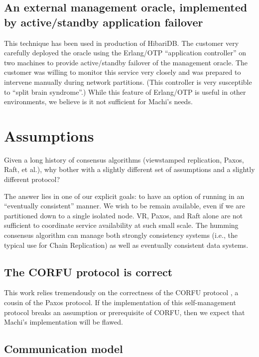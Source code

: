 \documentclass[preprint,10pt]{sigplanconf}
\begin{document}
\subsection{An external management oracle, implemented by
  active/standby application failover}

This technique has been used in production of HibariDB.  The customer
very carefully deployed the oracle using the Erlang/OTP ``application
controller'' on two machines to provide active/standby failover of the
management oracle.  The customer was willing to monitor this service
very closely and was prepared to intervene manually during network
partitions.  (This controller is very susceptible to ``split brain
syndrome''.)  While this feature of Erlang/OTP is useful in other
environments, we believe is it not sufficient for Machi's needs.

\section{Assumptions}
\label{sec:assumptions}

Given a long history of consensus algorithms (viewstamped replication,
Paxos, Raft, et al.), why bother with a slightly different set of
assumptions and a slightly different protocol?

The answer lies in one of our explicit goals: to have an option of
running in an ``eventually consistent'' manner.  We wish to be 
remain available, even if we are
partitioned down to a single isolated node.  VR, Paxos, and Raft
alone are not sufficient to coordinate service availability at such
small scale.  The humming consensus algorithm can manage
both strongly consistency systems (i.e., the typical use for Chain
Replication) as well as eventually consistent data systems.

\subsection{The CORFU protocol is correct}

This work relies tremendously on the correctness of the CORFU
protocol \cite{corfu1}, a cousin of the Paxos protocol.
If the implementation of
this self-management protocol breaks an assumption or prerequisite of
CORFU, then we expect that Machi's implementation will be flawed.

\subsection{Communication model}
\end{document}
